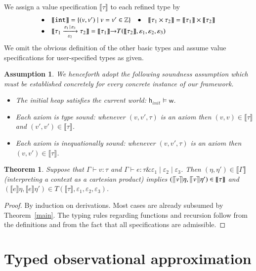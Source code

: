 \documentclass[nocopyrightspace,preprint]{sigplanconf}
\newcommand{\keywd}[1]{\mathtt{#1}}
\newcommand{\myeffto}[3]{\xrightarrow[#2]{#1\,\mid\, #3}}
\newcommand{\inttype}{\keywd{int}}
\newtheorem{assumption}{Assumption}
\newcommand{\eff}{\varepsilon}
\newcommand{\sem}[1]{\ensuremath{\llbracket {#1} \rrbracket}}
\newcommand{\semC}[1]{\ensuremath{\llbracket {#1} \rrbracket}}
\newcommand{\semV}[1]{\ensuremath{\llceil {#1} \rrceil
}}
\newtheorem{theorem}{Theorem}[section]
\newcommand\w{\ensuremath{\mathsf{w}}\xspace}
\newcommand\hinit{\ensuremath{\mathsf{h}_{\mathit{init}}}\xspace}
\newcommand{\myety}[4]{{#1}\mathrel{\&}{#2} \mid #3 \mid #4}
\begin{document}
We assign a value specification $\sem{\tau}$ 
to each refined type by
\[
\begin{array}{l}
\textrm{\textbullet\quad} \sem{\inttype} =  \{(v,v')\mid v=v'\in
\mathbb{Z}\} \quad
\textrm{\textbullet\quad} \sem{\tau_1\times\tau_2} = \sem{\tau_1}\times\sem{\tau_2}\\
\textrm{\textbullet\quad} \sem{\tau_1\myeffto{\eff_1}{\eff_2}{\eff_3} \tau_2} = \sem{\tau_1}{\rightarrow}T(\sem{\tau_2},\eff_1,\eff_2,\eff_3)
\end{array}\]
We omit the obvious definition of the other basic types and assume
value specifications for user-specified types as given.

\begin{assumption}\label{assi}
We henceforth adopt the following \emph{soundness assumption} which must be established concretely for every concrete instance of our framework. 
\begin{itemize}
\item The initial heap satisfies the current world: $\hinit\models\w$. 
\item Each axiom is type sound: whenever $(v,v',\tau)$ is an axiom then 
 $(v,v)\in\sem{\tau}$ and $(v',v')\in\sem{\tau}$. 
\item Each axiom is inequationally 
sound: whenever $(v,v',\tau)$ is an axiom then 
 $(v,v')\in\sem{\tau}$. 
\end{itemize}
\end{assumption}
\begin{theorem}\label{tysound}
Suppose that $\Gamma\vdash v:\tau$ and $\Gamma\vdash e:
\myety{\tau}{\eff_1}{\eff_2}{\eff_3}$. Then
$(\eta,\eta')\in\sem{\Gamma}$ (interpreting a context as a cartesian
product) implies $(\semV{v}\eta,\semV{v}\eta')\in\sem{\tau}$ and
$(\semC{e}\eta,\semC{e}\eta')\in T(\sem{\tau},\eff_1,\eff_2,\eff_3)$.
\end{theorem}
\begin{proof}
By induction on derivations. Most cases are already subsumed by
Theorem~\ref{main}.
The typing rules regarding functions and recursion follow from the definitions and from the fact that all specifications are admissible.  
\end{proof}
\section{Typed observational approximation}\label{obseq}
\end{document}
